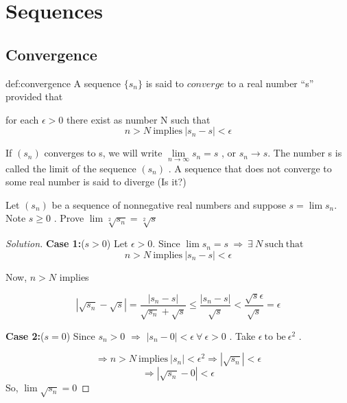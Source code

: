 \documentclass{notes}
\begin{document}
\chapter{Sequences}
\section{Convergence}

\begin{definition}[Convergence]{def:convergence}
	A sequence $\{ s_n \}$ is said to $converge$ to a real number ``s'' provided that 
	
	for each $\epsilon > 0$ there exist as number N such that
	\begin{equation} 
	n > N\ \mathrm{implies} \  |s_n - s|<\epsilon
	\end{equation}
	
	If $(s_n)$ converges to s, we will write $\lim\limits_{n \to  \infty} s_n = s$ , or $s_n \to  s$. The
	number s is called the limit of the sequence  $(s_n)$ . A sequence that
	does not converge to some real number is said to diverge (Is it?)
\end{definition}
\begin{problem}
	
	Let $(s_n)$ be a sequence of nonnegative real numbers and suppose
	$s = \lim s_n$. Note $s \geq 0$ . Prove $\lim \sqrt[2]{s_n} = \sqrt[2]{s}$
\end{problem}
\begin{proof}[Solution]
	
	\textbf{Case 1:}($s > 0$)  Let $\epsilon >0 $. Since $\lim s_n = s\ \Rightarrow\ \exists\ N\ \mathrm{such\ that}$
	\begin{equation}
	n>N\ \mathrm{implies}\ |s_n  - s|<\epsilon
	\end{equation}
	
	\hangindent=1.5cm Now, $n>N$ implies
	
	$$
	|\sqrt{s_n} - \sqrt{s}| = \frac{|s_n - s|}{\sqrt{s_n} + \sqrt{s}} \leq \frac{|s_n - s|}{\sqrt{s}} < \frac{\sqrt{s}\epsilon }{\sqrt{s}} = \epsilon
	$$	
	
	\hangindent=1.5cm \textbf{Case 2:}($s=0$) Since $s_n > 0$ $\Rightarrow$ $|s_n - 0|<\epsilon\ \forall\ \epsilon>0$ .
	Take $\epsilon\ \text{to be}\ \epsilon^2$ .
	
	$$\Rightarrow n>N\ \mathrm{implies}\ |s_n|<\epsilon^2 \Rightarrow |\sqrt{s_n}|<\epsilon$$
	$$ \Rightarrow |\sqrt{s_n} - 0|<\epsilon  $$ 
	\hangindent=1.5cm So, $\lim \sqrt{s_n} = 0$
\end{proof}
\end{document}

